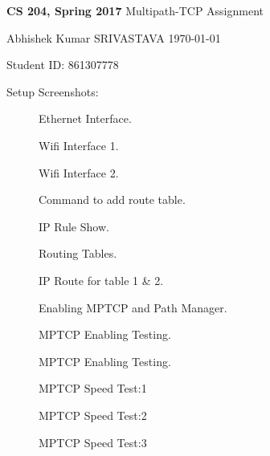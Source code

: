 \documentclass[a4paper,11pt]{article}
\renewcommand{\maketitle}{%
	
	\Large
 	\textbf{CS 204, Spring 2017}
 	\hfill
 	Multipath-TCP Assignment
 	\par
 	
	\Large
	Abhishek Kumar SRIVASTAVA
	\hfill
	\normalsize
	\today
 	\par
 	Student ID: 861307778
 	\par
 	

 	

 	
 	\hrulefill
 	\par \vspace{2ex}
 	}
\theoremstyle{quest}
\newenvironment{solution}[2][Solution]{\begin{trivlist}
		\item[\hskip \labelsep {\bfseries #1}\hskip \labelsep {\bfseries #2.}]}{\end{trivlist}}
\begin{document}
\thispagestyle{empty}
	
\maketitle

\begin{solution}
\textbf{Setup Screenshots}:

\begin{figure}[h]
	\centering
	\caption{Ethernet Interface.}
\end{figure}	
\begin{figure}[h]
	\centering
	\caption{Wifi Interface 1.}
\end{figure}	

\begin{figure}[h]
	\centering
	\caption{Wifi Interface 2.}
\end{figure}
\begin{figure}[h]
	\centering
	\caption{Command to add route table.}
\end{figure}
\begin{figure}[h]
	\centering
	\caption{IP Rule Show.}
\end{figure}
\begin{figure}[h]
	\centering
	\caption{Routing Tables.}
\end{figure}
\begin{figure}[h]
	\centering
	\caption{IP Route for table 1 \& 2.}
\end{figure}
\begin{figure}[h]
	\centering
	\caption{Enabling MPTCP and Path Manager.}
\end{figure}
\begin{figure}[h]
	\centering
	\caption{MPTCP Enabling Testing.}
\end{figure}
\begin{figure}[h]
	\centering
	\caption{MPTCP Enabling Testing.}
\end{figure}
\begin{figure}[h]
	\centering
	\caption{MPTCP Speed Test:1}
\end{figure}
\begin{figure}[h]
	\centering
	\caption{MPTCP Speed Test:2}
\end{figure}
\begin{figure}[h]
	\centering
	\caption{MPTCP Speed Test:3}
\end{figure}

\end{solution}
\end{document}
